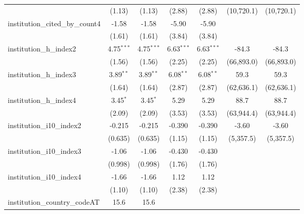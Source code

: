 \begin{tabular}{lcccccc}
                                         & (1.13)        & (1.13)        & (2.88)        & (2.88)        & (10,720.1)   & (10,720.1)\\   
   institution\_cited\_by\_count4        & -1.58         & -1.58         & -5.90         & -5.90         &              &   \\   
                                         & (1.61)        & (1.61)        & (3.84)        & (3.84)        &              &   \\   
   institution\_h\_index2                & 4.75$^{***}$  & 4.75$^{***}$  & 6.63$^{***}$  & 6.63$^{***}$  & -84.3        & -84.3\\   
                                         & (1.56)        & (1.56)        & (2.25)        & (2.25)        & (66,893.0)   & (66,893.0)\\   
   institution\_h\_index3                & 3.89$^{**}$   & 3.89$^{**}$   & 6.08$^{**}$   & 6.08$^{**}$   & 59.3         & 59.3\\   
                                         & (1.64)        & (1.64)        & (2.87)        & (2.87)        & (62,636.1)   & (62,636.1)\\   
   institution\_h\_index4                & 3.45$^{*}$    & 3.45$^{*}$    & 5.29          & 5.29          & 88.7         & 88.7\\   
                                         & (2.09)        & (2.09)        & (3.53)        & (3.53)        & (63,944.4)   & (63,944.4)\\   
   institution\_i10\_index2              & -0.215        & -0.215        & -0.390        & -0.390        & -3.60        & -3.60\\   
                                         & (0.635)       & (0.635)       & (1.15)        & (1.15)        & (5,357.5)    & (5,357.5)\\   
   institution\_i10\_index3              & -1.06         & -1.06         & -0.430        & -0.430        &              &   \\   
                                         & (0.998)       & (0.998)       & (1.76)        & (1.76)        &              &   \\   
   institution\_i10\_index4              & -1.66         & -1.66         & 1.12          & 1.12          &              &   \\   
                                         & (1.10)        & (1.10)        & (2.38)        & (2.38)        &              &   \\   
   institution\_country\_codeAT          & 15.6          & 15.6          &               &               &              &   \\   

\end{tabular}

